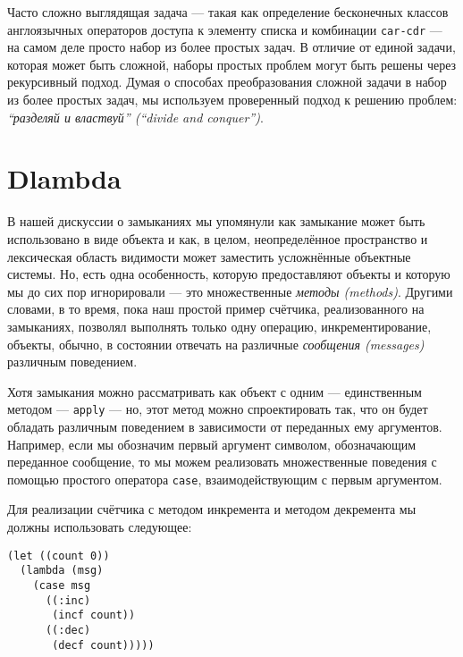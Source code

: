 Часто сложно выглядящая задача --- такая как определение бесконечных классов англоязычных операторов доступа к элементу списка и комбинации \verb"car-cdr" --- на самом деле просто набор из более простых задач. В отличие от единой задачи, которая может быть сложной, наборы простых проблем могут быть решены через рекурсивный подход. Думая о способах преобразования сложной задачи в набор из более простых задач, мы используем проверенный подход к решению проблем: \emph{``разделяй и властвуй'' (``divide and conquer'')}.

\section{Dlambda}\label{section_dlambda}

В нашей дискуссии о замыканиях мы упомянули как замыкание может быть использовано в виде объекта и как, в целом, неопределённое пространство и лексическая область видимости может заместить усложнённые объектные системы. Но, есть одна особенность, которую предоставляют объекты и которую мы до сих пор игнорировали --- это множественные \emph{методы (methods)}. Другими словами, в то время, пока наш простой пример счётчика, реализованного на замыканиях, позволял выполнять только одну операцию, инкрементирование, объекты, обычно, в состоянии отвечать на различные \emph{сообщения (messages)} различным поведением.

Хотя замыкания можно рассматривать как объект с одним --- единственным методом --- \verb"apply" --- но, этот метод можно спроектировать так, что он будет обладать различным поведением в зависимости от переданных ему аргументов. Например, если мы обозначим первый аргумент символом, обозначающим переданное сообщение, то мы можем реализовать множественные поведения с помощью простого оператора \verb"case", взаимодействующим с первым аргументом.

Для реализации счётчика с методом инкремента и методом декремента мы должны использовать следующее:

\begin{verbatim}
(let ((count 0))
  (lambda (msg)
    (case msg
      ((:inc)
       (incf count))
      ((:dec)
       (decf count)))))
\end{verbatim}

